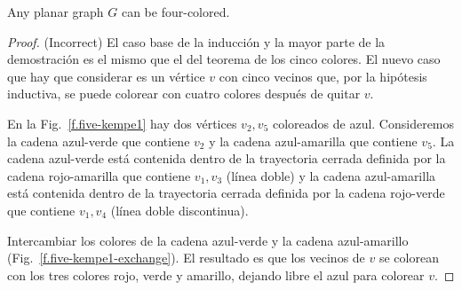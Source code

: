 \begin{theorem}\label{thm.fourcolor}
Any planar graph $G$ can be four-colored.
\end{theorem}

\begin{proof} (Incorrect) El caso base de la inducción y la mayor parte de la demostración es el mismo que el del teorema de los cinco colores. El nuevo caso que hay que considerar es un vértice $v$ con cinco vecinos que, por la hipótesis inductiva, se puede colorear con cuatro colores después de quitar $v$.

En la Fig.~\ref{f.five-kempe1} hay dos vértices $v_2,v_5$ coloreados de azul. Consideremos la cadena azul-verde que contiene $v_2$ y la cadena azul-amarilla que contiene $v_5$. La cadena azul-verde está contenida dentro de la trayectoria cerrada definida por la cadena rojo-amarilla que contiene $v_1,v_3$ (línea doble) y la cadena azul-amarilla está contenida dentro de la trayectoria cerrada definida por la cadena rojo-verde que contiene $v_1,v_4$ (línea doble discontinua).

Intercambiar los colores de la cadena azul-verde y la cadena azul-amarillo (Fig.~\ref{f.five-kempe1-exchange}). El resultado es que los vecinos de $v$ se colorean con los tres colores rojo, verde y amarillo, dejando libre el azul para colorear $v$.
\end{proof}

